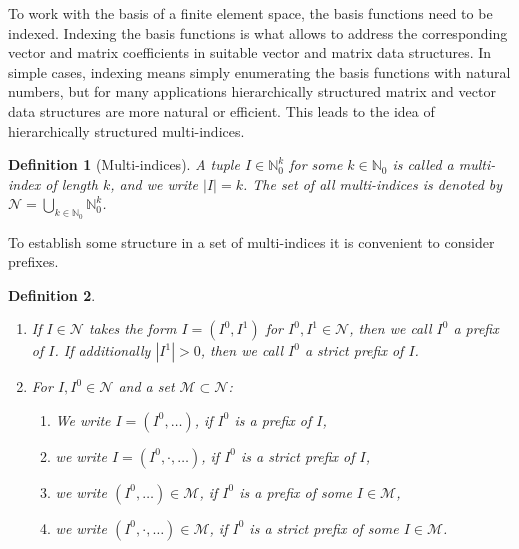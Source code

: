 \documentclass[a4paper,10pt,headings=normal,bibliography=totoc]{scrartcl}
\newtheorem{definition}{Definition}
\newcommand{\N}{\mathbb{N}}
\begin{document}
To work with the basis of a finite element space, the basis functions need to be indexed.  Indexing the basis functions
is what allows to address the corresponding vector and matrix coefficients in suitable vector and matrix data structures.
In simple cases, indexing means simply enumerating the basis functions with natural numbers, but for many applications
hierarchically structured matrix and vector data structures are more natural or efficient.  This leads to the idea
of hierarchically structured multi-indices.
%
\begin{definition}[Multi-indices]
 A tuple $I \in \N_0^k$ for some $k \in \N_0$ is called a multi-index of length $k$,
 and we write $|I|=k$.
 The set of all multi-indices is denoted by
 $\mathcal{N} = \bigcup_{k \in \N_0} \N_0^k$.
\end{definition}
%
To establish some structure in a set of multi-indices it is convenient to consider prefixes.
%
\begin{definition}\mbox{}  %
    \begin{enumerate}
        \item
            If $I \in \mathcal{N}$ takes the form $I = (I^0,I^1)$ for $I^0,I^1 \in \mathcal{N}$,
            then we call $I^0$ a prefix of $I$.
            If additionally $|I^1|>0$, then we call $I^0$ a strict prefix of $I$.
        \item
            For $I,I^0 \in \mathcal{N}$ and a set $\mathcal{M} \subset \mathcal{N}$:
            \begin{enumerate}
              \item
                We write $I=(I^0,\dots)$, if $I^0$ is a prefix of $I$,
              \item
                we write $I=(I^0,\cdot,\dots)$, if $I^0$ is a strict prefix of $I$,
              \item
                we write $(I^0,\dots) \in \mathcal{M}$, if $I^0$ is a prefix of some
                $I \in \mathcal{M}$,
              \item
                we write $(I^0,\cdot,\dots) \in \mathcal{M}$, if $I^0$ is a strict prefix of some
                $I \in \mathcal{M}$.
            \end{enumerate}
    \end{enumerate}
\end{definition}
\end{document}

